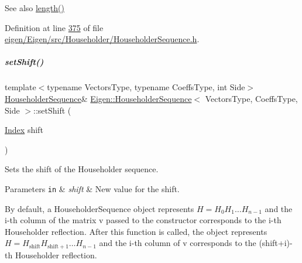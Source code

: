 \begin{DoxySeeAlso}{See also}
\hyperlink{group___householder___module_ac62fad812f3893f237378fe70e55bf66}{length()} 
\end{DoxySeeAlso}


Definition at line \hyperlink{eigen_2_eigen_2src_2_householder_2_householder_sequence_8h_source_l00375}{375} of file \hyperlink{eigen_2_eigen_2src_2_householder_2_householder_sequence_8h_source}{eigen/\+Eigen/src/\+Householder/\+Householder\+Sequence.\+h}.

\mbox{\label{group___householder___module_a2d8d996ce1085fd977850988735739f0}} 
\subparagraph{\texorpdfstring{set\+Shift()}{setShift()}\hspace{0.1cm}{\footnotesize\ttfamily [1/2]}}
{\footnotesize\ttfamily template$<$typename Vectors\+Type, typename Coeffs\+Type, int Side$>$ \\
\hyperlink{group___householder___module_class_eigen_1_1_householder_sequence}{Householder\+Sequence}\& \hyperlink{group___householder___module_class_eigen_1_1_householder_sequence}{Eigen\+::\+Householder\+Sequence}$<$ Vectors\+Type, Coeffs\+Type, Side $>$\+::set\+Shift (\begin{DoxyParamCaption}\item[{\hyperlink{group___core___module_a554f30542cc2316add4b1ea0a492ff02}{Index}}]{shift }\end{DoxyParamCaption})\hspace{0.3cm}{\ttfamily [inline]}}



Sets the shift of the Householder sequence. 


\begin{DoxyParams}[1]{Parameters}
\mbox{\tt in}  & {\em shift} & New value for the shift.\\
\hline
\end{DoxyParams}
By default, a Householder\+Sequence object represents $ H = H_0 H_1 \ldots H_{n-1} $ and the i-\/th column of the matrix {\ttfamily v} passed to the constructor corresponds to the i-\/th Householder reflection. After this function is called, the object represents $ H = H_{\mathrm{shift}} H_{\mathrm{shift}+1} \ldots H_{n-1} $ and the i-\/th column of {\ttfamily v} corresponds to the (shift+i)-\/th Householder reflection.

